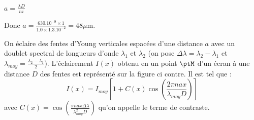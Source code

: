 
\begin{corrige}
	$a=\frac{\lambda D}{ni}$

	Donc $a=\frac{\num{630}.10^{-9} \times \num{1}}{\num{1.0} \times \num{1.3}.10^{-2}}=\num{48}\si{\mu\metre}$.
\end{corrige}


\finEntrainement







\hauteurLargeurCadreReponse		{6mm}{4cm}
\initialisationEntrainement

                                \initialisationPartieGauche %
On éclaire des fentes d'Young verticales espacées d'une distance $a$ avec un doublet spectral de longueurs d'onde $\lambda_1$ et $\lambda_2$ (on pose $\Delta \lambda=\lambda_2 -\lambda_1$ et $\lambda_{moy}=\frac{\lambda_2-\lambda_1}{2}$). L'éclairement $I(x)$ obtenu en un point $\ptM$ d'un écran à une distance $D$ des fentes est représenté sur la figure ci contre. Il est tel que :
$$ I(x)=I_{moy} \left[1+C(x)\cos\left(\frac{2\pi nax}{\lambda_{moy} D}\right)\right] $$ avec $C(x)=\cos\left(\frac{\pi nax \Delta \lambda}{\lambda_{moy}^2 D}\right)$ qu'on appelle le terme de contraste.

